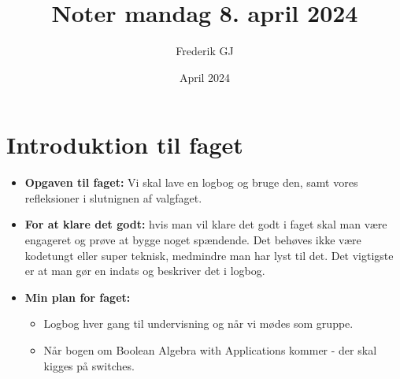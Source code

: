 \documentclass{article}
\title{Noter mandag 8. april 2024}
\author{Frederik GJ}
\date{April 2024}
\begin{document}
\maketitle

\section{Introduktion til faget}

\begin{itemize}
    \item \textbf{Opgaven til faget:} Vi skal lave en logbog og bruge den, samt vores refleksioner i slutnignen af valgfaget. 
    \item \textbf{For at klare det godt:} hvis man vil klare det godt i faget skal man være engageret og prøve at bygge noget spændende. Det behøves ikke være kodetungt eller super teknisk, medmindre man har lyst til det. 
    Det vigtigste er at man gør en indats og beskriver det i logbog. 
    \item \textbf{Min plan for faget:}
    \begin{itemize}
        \item Logbog hver gang til undervisning og når vi mødes som gruppe. 
        \item Når bogen om Boolean Algebra with Applications kommer - der skal kigges på switches. 
    \end{itemize}
\end{itemize}
\end{document}
